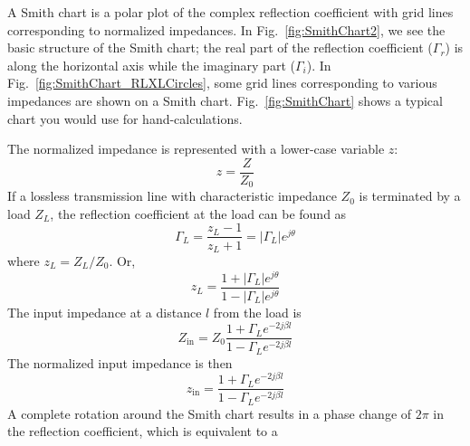 A Smith chart is a polar plot of the complex reflection coefficient with grid lines corresponding to normalized impedances. In Fig.\ \ref{fig:SmithChart2}, we see the basic structure of the Smith chart; the real part of the reflection coefficient ($\Gamma_r$) is along the horizontal axis while the imaginary part ($\Gamma_i$). In Fig.\ \ref{fig:SmithChart_RLXLCircles}, some grid lines corresponding to various impedances are shown on a Smith chart. Fig.\ \ref{fig:SmithChart} shows a typical chart you would use for hand-calculations. \par 

The normalized impedance is represented with a lower-case variable $z$:
\begin{equation}
    z = \dfrac{Z}{Z_0}
\end{equation}
If a lossless transmission line with characteristic impedance $Z_0$ is terminated by a load $Z_L$, the reflection coefficient at the load can be found as 
\begin{equation}
    \Gamma_L = \dfrac{z_L - 1}{z_L + 1} = |\Gamma_L| e^{j\theta}
\end{equation}
where $z_L = Z_L/Z_0$. Or, 
\begin{equation}
    z_L = \dfrac{1+|\Gamma_L|e^{j\theta}}{1-|\Gamma_L|e^{j\theta}}
\end{equation}
The input impedance at a distance $l$ from the load is  
\begin{equation}
    Z_\text{in} = Z_0 \dfrac{1 + \Gamma_L e^{-2j\beta l}}{1 - \Gamma_L e^{-2j\beta l}}
\end{equation}
The normalized input impedance is then 
\begin{equation}
    z_\text{in} = \dfrac{1 + \Gamma_L e^{-2j\beta l}}{1 - \Gamma_L e^{-2j\beta l}}
\end{equation}
A complete rotation around the Smith chart results in a phase change of $2\pi$ in the reflection coefficient, which is equivalent to a

